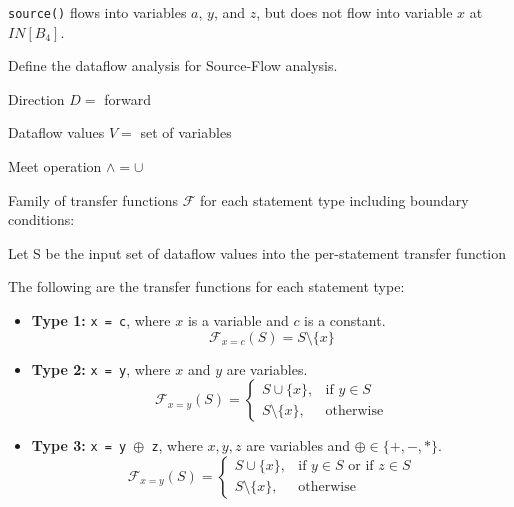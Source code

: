 \documentclass[12pt]{article}
\begin{document}
\begin{enumerate}
\begin{center}
    \end{center}

      \lstinline$source()$ flows into variables $a$, $y$, and $z$, but does not
      flow into variable $x$ at $IN[B_4]$.

      Define the dataflow analysis for Source-Flow analysis.

      \begin{mdframed}
        Direction $D = $ forward

        Dataflow values $V = $ set of variables

        Meet operation $\wedge = \cup $

        Family of transfer functions $\mathcal{F}$ for each statement type
        including boundary conditions:

        Let S be the input set of dataflow values into the per-statement transfer function

        The following are the transfer functions for each statement type:

        \begin{itemize}

            \item \textbf{Type 1:} \texttt{x = c}, where $x$ is a variable and $c$ is a constant.
            \[
                \mathcal{F}_{x = c}(S) = S \setminus \{x\}
            \]

            \item \textbf{Type 2:} \texttt{x = y}, where $x$ and $y$ are variables.
            \[
                \mathcal{F}_{x = y}(S) =
                \begin{cases}
                    S \cup \{x\}, & \text{if } y \in S \\
                    S \setminus \{x\}, & \text{otherwise}
                \end{cases}
            \]

            \item \textbf{Type 3:} \texttt{x = y $\oplus$ z}, where $x, y, z$ are variables and $\oplus \in \{+, -, *\}$.
            \[
                \mathcal{F}_{x = y}(S) =
                \begin{cases}
                    S \cup \{x\}, & \text{if } y \in S \text{ or } \text{if } z \in S \\
                    S \setminus \{x\}, & \text{otherwise}
                \end{cases}
            \]


\end{itemize}
\end{mdframed}
\end{enumerate}
\end{document}

